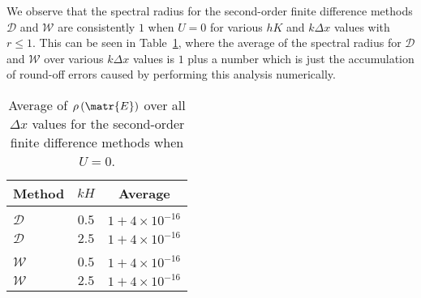 We observe that the spectral radius for the second-order finite difference methods $\mathcal{D}$ and $\mathcal{W}$ are consistently $1$ when $U=0$ for various $hK$ and $k\Delta x$ values with $r \le 1$. This can be seen in Table~\ref{tab:Averageofspectralradiusu=0}, where the average of the spectral radius for $\mathcal{D}$ and $\mathcal{W}$ over various $k \Delta x$ values is $1$ plus a number which is just the accumulation of round-off errors caused by performing this analysis numerically.
%
%
\begin{table}
	\centering
	\begin{tabular}{l  c  c}
		\hline
		Method & $kH$& Average\\
		\hline && \\
		$\mathcal{D}$& $0.5$ & $1+ 4\times 10^{-16}$  \\
		$\mathcal{D}$& $2.5$ & $1+ 4\times 10^{-16}$  \\
		\hline \\
		$\mathcal{W}$& $0.5$ & $1+ 4\times 10^{-16}$  \\
		$\mathcal{W}$& $2.5$ & $1+ 4\times 10^{-16}$ \\
		\hline
	\end{tabular}
	\caption{Average of $\rho\left(\matr{E}\right)$ over all $\Delta x$ values for the second-order finite difference methods when $U=0$.}
	\label{tab:Averageofspectralradiusu=0}
\end{table}
